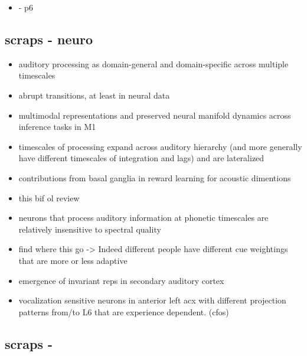 \begin{itemize}
\item \cite{dubreuilComplementaryRolesDimensionality2020} - p6
\end{itemize}

\subsection{scraps - neuro}


\begin{itemize}
\item auditory processing as domain-general and domain-specific across multiple timescales \cite{norman-haignereHierarchicalIntegrationMultiple2020}
\item abrupt transitions, at least in neural data \cite{durstewitzAbruptTransitionsPrefrontal2010}
\item multimodal representations and preserved neural manifold dynamics across inference tasks in M1 \cite{gallegoCorticalPopulationActivity2018}
\item timescales of processing expand across auditory hierarchy (and more generally have different timescales of integration and lags) \cite{norman-haignereHierarchicalIntegrationMultiple2020} and are lateralized \cite{levyCircuitAsymmetriesUnderlie2019a}
\item contributions from basal ganglia in reward learning for acoustic dimentions \cite{limHowMayBasal2014}
\item this bif ol review \cite{rauscheckerMapsStreamsAuditory2009b}
\item neurons that process auditory information at phonetic timescales are relatively insensitive to spectral quality \cite{norman-haignereHierarchicalIntegrationMultiple2020}
\item find where this go -> Indeed different people have different cue weightings that are more or less adaptive\cite{clayardsDifferencesCueWeights2018}
\item emergence of invariant reps in secondary auditory cortex\cite{carruthersEmergenceInvariantRepresentation2015c}
\item vocalization sensitive neurons in anterior left acx with different projection patterns from/to L6 that are experience dependent. (cfos\cite{levyCircuitAsymmetriesUnderlie2019a})
\end{itemize}


\subsection{scraps - }